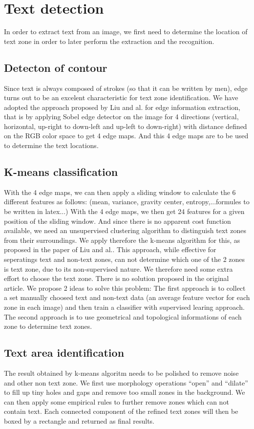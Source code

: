 \documentclass[paper=a4, french, 11pt]{scrartcl}
\begin{document}
\section{Text detection}
In order to extract text from an image, we first need to determine the location of text zone in order to later perform the extraction and the recognition.  
\subsection{Detecton of contour}
Since text is always composed of strokes (so that it can be written by men), edge turns out to be an excelent characteristic for text zone identification. We have adopted the approach proposed by Liu and al. for edge information extraction, that is by applying Sobel edge detector on the image for 4 directions (vertical, horizontal, up-right to down-left and up-left to down-right) with distance defined on the RGB color space to get 4 edge maps. And this 4 edge maps are to be used to determine the text locations.
\subsection{K-means classification}
With the 4 edge maps, we can then apply a sliding window to calculate the 6 different features as follows:
(mean, variance, gravity center, entropy,...formules to be written in latex...)
With the 4 edge maps, we then get 24 features for a given position of the sliding window. And since there is no apparent cost function available, we need an unsupervised clustering algorithm to distinguish text zones from their surroundings. We apply therefore the k-means algorithm for this, as proposed in the paper of Liu and al..
This approach, while effective for seperatings text and non-text zones, can not determine which one of the 2 zones is text zone, due to its non-supervised nature. We therefore need some extra effort to choose the text zone. There is no solution proposed in the original article. We propose 2 ideas to solve this problem: The first approach is to collect a set manually choosed text and non-text data (an average feature vector for each zone in each image) and then train a classifier with supervised learing approach. The second approach is to use geometrical and topological informations of each zone to determine text zones.
\subsection{Text area identification}
 The result obtained by k-means algoritm needs to be polished to remove noise and other non text zone. We first use morphology operations “open” and “dilate” to fill up tiny holes and gaps and remove too small zones in the background. We can then apply some empirical rules to further remove zones which can not contain text. Each connected component of the refined text zones will then be boxed by a rectangle and returned as final results.
\end{document}
